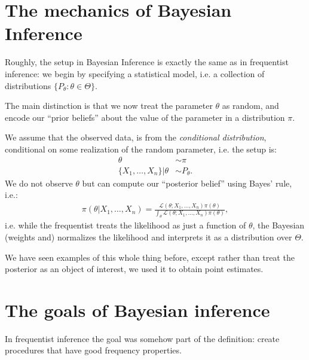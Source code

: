 \documentclass[twoside,12pt]{article}
\begin{document}
\section{The mechanics of Bayesian Inference}
Roughly, the setup in Bayesian Inference is exactly the same as in frequentist inference: we begin by specifying a statistical model, i.e. a collection of distributions $\{P_{\theta}: \theta \in \Theta\}$.

The main distinction is that we now treat the parameter $\theta$ as random, and encode our ``prior beliefs'' about the value of the parameter in a distribution $\pi$. 

We assume that the observed data, is from the \emph{conditional distribution}, conditional on some realization of the random parameter, i.e. the setup is:
\begin{align*}
\theta &\sim \pi \\
\{X_1,\ldots,X_n\} | \theta &\sim P_{\theta}.
\end{align*}
We do not observe $\theta$ but can compute our ``posterior belief'' using Bayes' rule, i.e.:
\begin{align*}
\pi(\theta | X_1,\ldots,X_n) = \frac{ \mathcal{L}(\theta; X_1,\ldots,X_n) \pi(\theta)}{ \int_{\theta}  \mathcal{L}(\theta; X_1,\ldots,X_n) \pi(\theta)},
\end{align*}
i.e. while the frequentist treats the likelihood as just a function of $\theta$, the Bayesian (weights and) normalizes the likelihood and interprets it as a distribution over $\Theta$.

We have seen examples of this whole thing before, except rather than treat the posterior as an object of interest, we used it to obtain point estimates.




\section{The goals of Bayesian inference}
In frequentist inference the goal was somehow part of the definition: create procedures that have good frequency properties.
\end{document}
